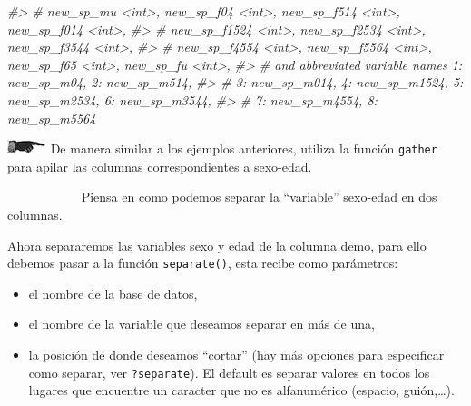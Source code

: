 \documentclass[
]{book}
\newenvironment{Shaded}{\begin{snugshade}}{\end{snugshade}}
\newcommand{\CommentTok}[1]{\textcolor[rgb]{0.56,0.35,0.01}{\textit{#1}}}
\begin{document}
\begin{Shaded}
\begin{Highlighting}[]
\CommentTok{\#\textgreater{} \#   new\_sp\_mu \textless{}int\textgreater{}, new\_sp\_f04 \textless{}int\textgreater{}, new\_sp\_f514 \textless{}int\textgreater{}, new\_sp\_f014 \textless{}int\textgreater{},}
\CommentTok{\#\textgreater{} \#   new\_sp\_f1524 \textless{}int\textgreater{}, new\_sp\_f2534 \textless{}int\textgreater{}, new\_sp\_f3544 \textless{}int\textgreater{},}
\CommentTok{\#\textgreater{} \#   new\_sp\_f4554 \textless{}int\textgreater{}, new\_sp\_f5564 \textless{}int\textgreater{}, new\_sp\_f65 \textless{}int\textgreater{}, new\_sp\_fu \textless{}int\textgreater{},}
\CommentTok{\#\textgreater{} \#   and abbreviated variable names 1: new\_sp\_m04, 2: new\_sp\_m514,}
\CommentTok{\#\textgreater{} \#   3: new\_sp\_m014, 4: new\_sp\_m1524, 5: new\_sp\_m2534, 6: new\_sp\_m3544,}
\CommentTok{\#\textgreater{} \#   7: new\_sp\_m4554, 8: new\_sp\_m5564}
\end{Highlighting}
\end{Shaded}

\includegraphics{imagenes/manicule2.jpg} De manera similar a los ejemplos anteriores,
utiliza la función \texttt{gather} para apilar las columnas correspondientes a
sexo-edad.

~~~~~~~~~~~ Piensa en
como podemos separar la ``variable'' sexo-edad en dos columnas.

Ahora separaremos las variables sexo y edad de la columna demo, para ello
debemos pasar a la función \texttt{separate()}, esta recibe como parámetros:

\begin{itemize}
\item
  el nombre de la base de datos,
\item
  el nombre de la variable que deseamos separar en más de una,
\item
  la posición de donde deseamos ``cortar'' (hay más opciones para especificar
  como separar, ver \texttt{?separate}). El default es separar valores en todos los
  lugares que encuentre un caracter que no es alfanumérico (espacio, guión,\ldots).
\end{itemize}
\end{document}
